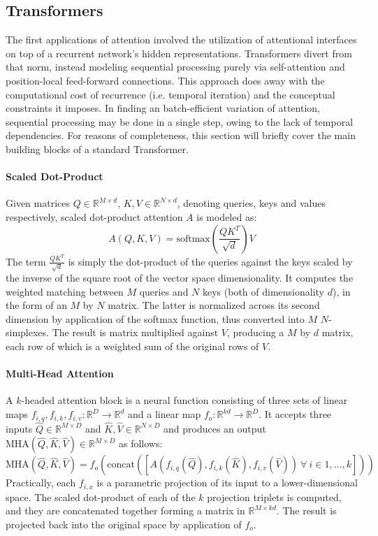 \subsection{Transformers}
The first applications of attention involved the utilization of attentional interfaces on top of a recurrent network's hidden representations.
Transformers divert from that norm, instead modeling sequential processing purely via self-attention and position-local feed-forward connections.
This approach does away with the computational cost of recurrence (i.e. temporal iteration) and the conceptual constraints it imposes.
In finding an batch-efficient variation of attention, sequential processing may be done in a single step, owing to the lack of temporal dependencies.
For reasons of completeness, this section will briefly cover the main building blocks of a standard Transformer.

\paragraph{Scaled Dot-Product}
Given matrices $Q \in \mathbb{R}^{M\times d}$, $K, V \in \mathbb{R}^{N\times d}$, denoting queries, keys and values respectively, scaled dot-product attention $A$ is modeled as:
\[
A(Q,K,V) = \text{softmax}(\frac{QK^T}{\sqrt{d}})V
\]
The term $\frac{QK^T}{\sqrt{d}}$ is simply the dot-product of the queries against the keys scaled by the inverse of the square root of the vector space dimensionality.
It computes the weighted matching between $M$ queries and $N$ keys (both of dimensionality $d$), in the form of an $M$ by $N$ matrix.
The latter is normalized across its second dimension by application of the softmax function, thus converted into $M$ $N$-simplexes.
The result is matrix multiplied against $V$, producing a $M$ by $d$ matrix, each row of which is a weighted sum of the original rows of $V$.

\paragraph{Multi-Head Attention} A $k$-headed attention block is a neural function consisting of three sets of linear maps $f_{i,q}, f_{i, k}, f_{i, v}: \mathbb{R}^D \to \mathbb{R}^d$ and a linear map $f_o: \mathbb{R}^{kd} \to \mathbb{R}^D$.
It accepts three inputs $\hat{Q} \in \mathbb{R}^{M\times D}$ and $\hat{K}, \hat{V} \in \mathbb{R}^{N\times D}$ and produces an output $\text{MHA}(\hat{Q}, \hat{K}, \hat{V}) \in \mathbb{R}^{M \times D}$ as follows:
\[
\text{MHA}(\hat{Q}, \hat{K}, \hat{V}) = f_o \left ( 
    \text{concat} \left (
        \left [
            A \left (
                f_{i,q}(\hat{Q}),
                f_{i,k}(\hat{K}),
                f_{i,v}(\hat{V})
            \right )
        \
        \forall \ i \in 1,\dots, k
        \right ]
    \right )
\right )
\]
Practically, each $f_{i,x}$ is a parametric projection of its input to a lower-dimensional space.
The scaled dot-product of each of the $k$ projection triplets is computed, and they are concatenated together forming a matrix in $\mathbb{R}^{M\times kd}$.
The result is projected back into the original space by application of $f_o$.

